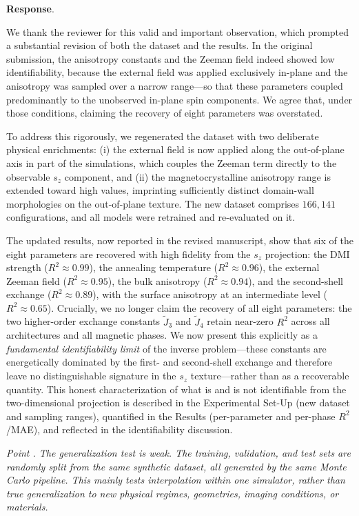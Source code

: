 \documentclass[review,12pt]{report}
\newenvironment{reviewer}{\setcounter{pointcounter}{1}}{}
\newcommand{\point}[1]{\medskip \noindent
 \textsl{{\fontseries{b}\selectfont Point \thepointcounter}.
 \stepcounter{pointcounter} #1}}
\newcommand{\reply}{\medskip \noindent \textbf{Response}.\ }
\begin{document}
\begin{reviewer}
\reply{We thank the reviewer for this valid and important observation, which prompted a substantial revision of both the dataset and the results. In the original submission, the anisotropy constants and the Zeeman field indeed showed low identifiability, because the external field was applied exclusively in-plane and the anisotropy was sampled over a narrow range---so that these parameters coupled predominantly to the unobserved in-plane spin components. We agree that, under those conditions, claiming the recovery of eight parameters was overstated.

To address this rigorously, we regenerated the dataset with two deliberate physical enrichments: (i) the external field is now applied along the out-of-plane axis in part of the simulations, which couples the Zeeman term directly to the observable $s_z$ component, and (ii) the magnetocrystalline anisotropy range is extended toward high values, imprinting sufficiently distinct domain-wall morphologies on the out-of-plane texture. The new dataset comprises $166{,}141$ configurations, and all models were retrained and re-evaluated on it.

The updated results, now reported in the revised manuscript, show that six of the eight parameters are recovered with high fidelity from the $s_z$ projection: the DMI strength ($R^2 \approx 0.99$), the annealing temperature ($R^2 \approx 0.96$), the external Zeeman field ($R^2 \approx 0.95$), the bulk anisotropy ($R^2 \approx 0.94$), and the second-shell exchange ($R^2 \approx 0.89$), with the surface anisotropy at an intermediate level ($R^2 \approx 0.65$). Crucially, we no longer claim the recovery of all eight parameters: the two higher-order exchange constants $\tilde{J}_3$ and $\tilde{J}_4$ retain near-zero $R^2$ across all architectures and all magnetic phases. We now present this explicitly as a \emph{fundamental identifiability limit} of the inverse problem---these constants are energetically dominated by the first- and second-shell exchange and therefore leave no distinguishable signature in the $s_z$ texture---rather than as a recoverable quantity. This honest characterization of what is and is not identifiable from the two-dimensional projection is described in the Experimental Set-Up (new dataset and sampling ranges), quantified in the Results (per-parameter and per-phase $R^2$/MAE), and reflected in the identifiability discussion.}



\point{The generalization test is weak. The training, validation, and test sets are randomly split from the same synthetic dataset, all generated by the same Monte Carlo pipeline. This mainly tests interpolation within one simulator, rather than true generalization to new physical regimes, geometries, imaging conditions, or materials.}


\end{reviewer}
\end{document}
